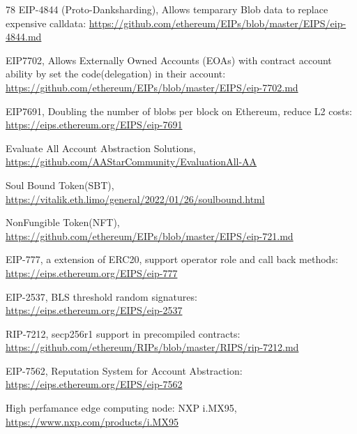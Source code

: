 \documentclass[preprint,12pt]{elsarticle}
\begin{document}
\begin{thebibliography}{78}
EIP-4844 (Proto-Danksharding), Allows temparary Blob data to replace expensive calldata:
\url{https://github.com/ethereum/EIPs/blob/master/EIPS/eip-4844.md}

EIP7702, Allows Externally Owned Accounts (EOAs) with contract account ability by set the code(delegation) in their account:
\url{https://github.com/ethereum/EIPs/blob/master/EIPS/eip-7702.md}

EIP7691, Doubling the number of blobs per block on Ethereum, reduce L2 costs:
\url{https://eips.ethereum.org/EIPS/eip-7691}

Evaluate All Account Abstraction Solutions,
\url{https://github.com/AAStarCommunity/EvaluationAll-AA}

Soul Bound Token(SBT),
\url{https://vitalik.eth.limo/general/2022/01/26/soulbound.html}

NonFungible Token(NFT),
\url{https://github.com/ethereum/EIPs/blob/master/EIPS/eip-721.md}

EIP-777, a extension of ERC20, support operator role and call back methods:
\url{https://eips.ethereum.org/EIPS/eip-777}

EIP-2537, BLS threshold random signatures:
\url{https://eips.ethereum.org/EIPS/eip-2537}

RIP-7212, secp256r1 support in precompiled contracts:
\url{https://github.com/ethereum/RIPs/blob/master/RIPS/rip-7212.md}

EIP-7562, Reputation System for Account Abstraction:
\url{https://eips.ethereum.org/EIPS/eip-7562}

High perfamance edge computing node: NXP i.MX95,
\url{https://www.nxp.com/products/i.MX95}



\end{thebibliography}
\end{document}
